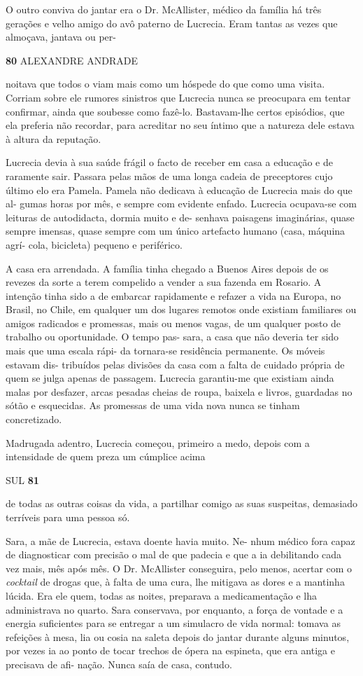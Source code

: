 O outro conviva do jantar era o Dr. McAllister, médico da família há
três gerações e velho amigo do avô paterno de Lucrecia. Eram tantas as
vezes que almoçava, jantava ou per-

\textbf{80 }ALEXANDRE ANDRADE

noitava que todos o viam mais como um hóspede do que como uma visita.
Corriam sobre ele rumores sinistros que Lucrecia nunca se preocupara em
tentar confirmar, ainda que soubesse como fazê-lo. Bastavam-lhe certos
episódios, que ela preferia não recordar, para acreditar no seu íntimo
que a natureza dele estava à altura da reputação.

Lucrecia devia à sua saúde frágil o facto de receber em casa a educação
e de raramente sair. Passara pelas mãos de uma longa cadeia de
preceptores cujo último elo era Pamela. Pamela não dedicava à educação
de Lucrecia mais do que al- gumas horas por mês, e sempre com evidente
enfado. Lucrecia ocupava-se com leituras de autodidacta, dormia muito e
de- senhava paisagens imaginárias, quase sempre imensas, quase sempre
com um único artefacto humano (casa, máquina agrí- cola, bicicleta)
pequeno e periférico.

A casa era arrendada. A família tinha chegado a Buenos Aires depois de
os revezes da sorte a terem compelido a vender a sua fazenda em Rosario.
A intenção tinha sido a de embarcar rapidamente e refazer a vida na
Europa, no Brasil, no Chile, em qualquer um dos lugares remotos onde
existiam familiares ou amigos radicados e promessas, mais ou menos
vagas, de um qualquer posto de trabalho ou oportunidade. O tempo pas-
sara, a casa que não deveria ter sido mais que uma escala rápi- da
tornara-se residência permanente. Os móveis estavam dis- tribuídos pelas
divisões da casa com a falta de cuidado própria de quem se julga apenas
de passagem. Lucrecia garantiu-me que existiam ainda malas por desfazer,
arcas pesadas cheias de roupa, baixela e livros, guardadas no sótão e
esquecidas. As promessas de uma vida nova nunca se tinham concretizado.

Madrugada adentro, Lucrecia começou, primeiro a medo, depois com a
intensidade de quem preza um cúmplice acima

SUL \textbf{81}

de todas as outras coisas da vida, a partilhar comigo as suas suspeitas,
demasiado terríveis para uma pessoa só.

Sara, a mãe de Lucrecia, estava doente havia muito. Ne- nhum médico fora
capaz de diagnosticar com precisão o mal de que padecia e que a ia
debilitando cada vez mais, mês após mês. O Dr. McAllister conseguira,
pelo menos, acertar com o \emph{cocktail }de drogas que, à falta de uma
cura, lhe mitigava as dores e a mantinha lúcida. Era ele quem, todas as
noites, preparava a medicamentação e lha administrava no quarto. Sara
conservava, por enquanto, a força de vontade e a energia suficientes
para se entregar a um simulacro de vida normal: tomava as refeições à
mesa, lia ou cosia na saleta depois do jantar durante alguns minutos,
por vezes ia ao ponto de tocar trechos de ópera na espineta, que era
antiga e precisava de afi- nação. Nunca saía de casa, contudo.

